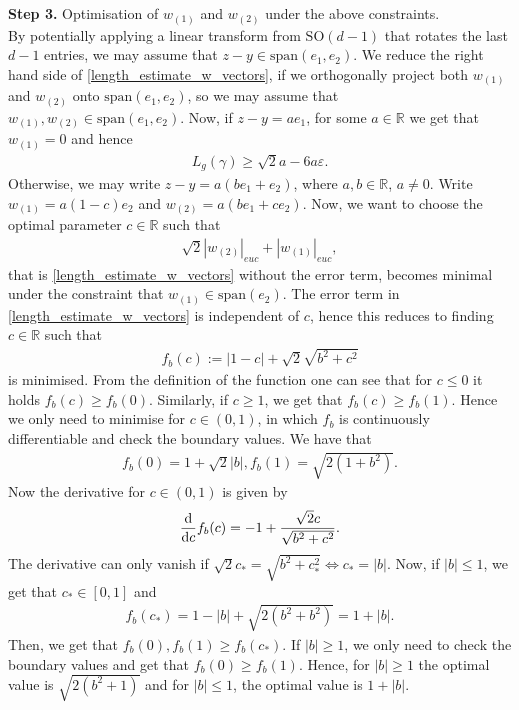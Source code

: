 \documentclass[a4paper,10pt]{article}
\numberwithin{equation}{section}
\newcommand{\R}{\mathbb{R}}
\newcommand{\e}{\varepsilon}
\newcommand{\di}{{\rm d}}
\begin{document}
\textbf{Step 3.} Optimisation of $w_{(1)}$ and $w_{(2)}$ under the above constraints. \\
By potentially applying a linear transform from $\mathrm{SO}(d-1)$ that rotates the last $d-1$ entries, we may assume that $z-y \in \mathrm{span}(e_1, e_2)$.
We reduce the right hand side of \eqref{length_estimate_w_vectors}, if we orthogonally project both $w_{(1)}$ and $w_{(2)}$ onto $\mathrm{span}(e_1, e_2)$, so we may assume that  $w_{(1)},w_{(2)} \in \mathrm{span}(e_1, e_2)$. 
Now, if $z-y= ae_1$, for some $a \in \R$ we get that $w_{(1)}=0$ and hence
\begin{align}\label{estimate_x_1_direction_eps}
    L_g({\gamma}) \geq \sqrt{2}a -6a\e.
\end{align}
Otherwise, we may write $z-y = a(be_1+e_2)$, where $a, b \in \R$, $a \neq 0$.
Write $w_{(1)} = a(1-c)e_2$ and $w_{(2)} = a(be_1+ ce_2)$.
Now, we want to choose the optimal parameter $c \in \R$ such that
\begin{align*}
    \sqrt{2}|w_{(2)}|_{euc} + |w_{(1)}|_{euc},
\end{align*}
that is \eqref{length_estimate_w_vectors} without the error term, becomes minimal under the constraint that $w_{(1)} \in \mathrm{span}(e_2)$.
The error term in \eqref{length_estimate_w_vectors} is independent of $c$, hence this reduces to finding $c \in \R$ such that 
\begin{align}\label{one_dim_miminisation_problem}
    f_b(c):=|1-c| + \sqrt{2}\sqrt{b^2+c^2}
\end{align}
is minimised. From the definition of the function one can see that for $c \leq 0$ it holds $f_b(c) \geq f_b(0)$. Similarly, if $c \geq 1$, we get that $f_b(c) \geq f_b(1)$. Hence we only need to minimise for $c \in (0,1)$, in which $f_b$ is continuously differentiable and check the boundary values.
We have that 
\begin{align*}
    f_b(0) = 1+\sqrt{2}|b|, f_b(1) = \sqrt{2(1+b^2)}.
\end{align*}
Now the derivative for $c \in (0,1)$ is given by
\begin{align*}
    \frac{\di}{\di c}f_b(c) = -1 +\frac{\sqrt{2}c}{\sqrt{b^2+c^2}}.
\end{align*}
The derivative can only vanish if  $\sqrt{2}c_* = \sqrt{b^2+c_*^2} \iff c_*= |b|$.
Now, if $|b| \leq 1$, we get that $c_* \in [0,1]$ and 
\begin{align*}
    f_b(c_*) = 1-|b| + \sqrt{2(b^2+b^2)} = 1+|b|.
\end{align*}
Then, we get that $f_b(0), f_b(1) \geq f_b(c_*)$.
If $|b| \geq 1$, we only need to check the boundary values and get that $f_b(0) \geq f_b(1)$.
Hence, for $|b|\geq 1$ the optimal value is $\sqrt{2(b^2+1)}$ and for $|b| \leq 1$, the optimal value is $1+|b|$.
\end{document}

